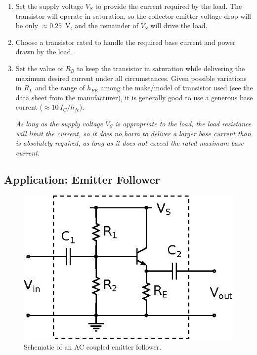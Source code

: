 \documentclass[11pt]{article}
\begin{document}
\begin{enumerate}
\item Set the supply voltage $V_S$ to provide the current required by
  the load. The transistor will operate in saturation, so the
  collector-emitter voltage drop will be only $\approx 0.25$~V, and
  the remainder of $V_S$ will drive the load.

\item Choose a transistor rated to handle the required base current
  and power drawn by the load.
  
\item Set the value of $R_B$ to keep the transistor in saturation
  while delivering the maximum desired current under all
  circumstances. Given possible variations in $R_L$ and the range
  of $h_{FE}$ among the make/model of transistor used (see the data
  sheet from the manufacturer), it is generally good to use a generous
  base current ($\approx 10~I_C/h_{fe}$).

  \emph{As long as the supply voltage $V_S$ is appropriate to the
    load, the load resistance will limit the current, so it does no
    harm to deliver a larger base current than is absolutely required,
    as long as it does not exceed the rated maximum base current.}
\end{enumerate}

\subsection{Application: Emitter Follower}
\label{sec:emitterfollower}

\begin{figure}[ht]
  \begin{center}
    \includegraphics{emitterfollower.eps}
    \caption{Schematic of an AC coupled emitter follower.}
    \label{fig:emitterfollower}
  \end{center}
\end{figure}
\end{document}
